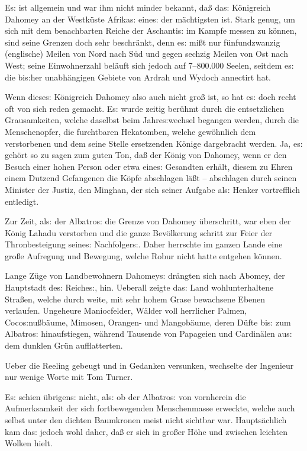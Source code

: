 \documentclass[oneside,12pt]{book}
\newcommand{\s}{s:}
\begin{document}
E{\s} ist allgemein und war ihm nicht minder bekannt, da{\ss} da{\s}
K\"onigreich Dahomey an der Westk\"uste Afrika{\s} eine{\s} der
m\"achtigsten ist. Stark genug, um sich mit dem benachbarten Reiche
der Aschanti{\s} im Kampfe messen zu k\"onnen, sind seine Grenzen
doch sehr beschr\"ankt, denn e{\s} mi{\ss}t nur f\"unfundzwanzig
(englische) Meilen von Nord nach S\"ud und gegen sechzig Meilen von
Ost nach West; seine Einwohnerzahl bel\"auft sich jedoch auf
7--800.000 Seelen, seitdem e{\s} die bi{\s}her unabh\"angigen Gebiete
von Ardrah und Wydoch annectirt hat.

Wenn diese{\s} K\"onigreich Dahomey also auch nicht gro{\ss} ist, so
hat e{\s} doch recht oft von sich reden gemacht. E{\s} wurde zeitig
ber\"uhmt durch die entsetzlichen Grausamkeiten, welche daselbst beim
Jahre{\s}wechsel begangen werden, durch die Menschenopfer, die
furchtbaren Hekatomben, welche gew\"ohnlich dem verstorbenen und dem
seine Stelle ersetzenden K\"onige dargebracht werden. Ja, e{\s}
geh\"ort so zu sagen zum guten Ton, da{\ss} der K\"onig von Dahomey,
wenn er den Besuch einer hohen Person oder etwa eine{\s} Gesandten
erh\"alt, diesem zu Ehren einem Dutzend Gefangenen die K\"opfe
abschlagen l\"a{\ss}t -- abschlagen durch seinen Minister der Justiz,
den {\glqq}Minghan{\grqq}, der sich seiner Aufgabe al{\s} Henker
vortrefflich entledigt.

Zur Zeit, al{\s} der {\glqq}Albatro{\s}{\grqq} die Grenze von Dahomey
\"uberschritt, war eben der K\"onig Lahadu verstorben und die ganze
Bev\"olkerung schritt zur Feier der Thronbesteigung seine{\s}
Nachfolger{\s}. Daher herrschte im ganzen Lande eine gro{\ss}e
Aufregung und Bewegung, welche Robur nicht hatte entgehen k\"onnen.

Lange Z\"uge von Landbewohnern Dahomey{\s} dr\"angten sich nach
Abomey, der Hauptstadt de{\s} Reiche{\s}, hin. Ueberall zeigte da{\s}
Land wohlunterhaltene Stra{\ss}en, welche durch weite, mit sehr hohem
Grase bewachsene Ebenen verlaufen. Ungeheure Maniocfelder, W\"alder
voll herrlicher Palmen, Coco{\s}nu{\ss}b\"aume, Mimosen, Orangen- und
Mangob\"aume, deren D\"ufte bi{\s} zum {\glqq}Albatro{\s}{\grqq}
hinaufstiegen, w\"ahrend Tausende von Papageien und Cardin\"alen
au{\s} dem dunklen Gr\"un auf\/flatterten.

Ueber die Reeling gebeugt und in Gedanken versunken, wechselte der
Ingenieur nur wenige Worte mit Tom Turner.

E{\s} schien \"ubrigen{\s} nicht, al{\s} ob der
{\glqq}Albatro{\s}{\grqq} von vornherein die Aufmerksamkeit der sich
fortbewegenden Menschenmasse erweckte, welche auch selbst unter den
dichten Baumkronen meist nicht sichtbar war. Haupts\"achlich kam
da{\s} jedoch wohl daher, da{\ss} er sich in gro{\ss}er H\"ohe und
zwischen leichten Wolken hielt.
\end{document}
